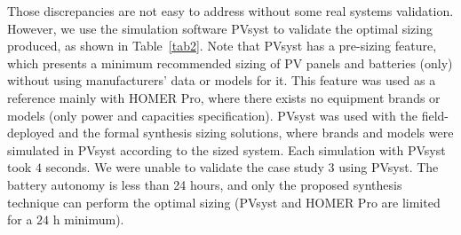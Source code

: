 \documentclass[10pt,journal,compsoc]{IEEEtran}
\begin{document}
Those discrepancies are not easy to address without some real systems validation. However, we use the simulation software PVsyst to validate the optimal sizing produced, as shown in Table~\ref{tab2}. Note that PVsyst has a pre-sizing feature, which presents a minimum recommended sizing of PV panels and batteries (only) without using manufacturers' data or models for it. This feature was used as a reference mainly with HOMER Pro, where there exists no equipment brands or models (only power and capacities specification). PVsyst was used with the field-deployed and the formal synthesis sizing solutions, where brands and models were simulated in PVsyst according to the sized system. Each simulation with PVsyst took $4$ seconds. We were unable to validate the case study $3$ using PVsyst. The battery autonomy is less than 24 hours, and only the proposed synthesis technique can perform the optimal sizing (PVsyst and HOMER Pro are limited for a $24$ h minimum).  \color{black}
%
\end{document}

